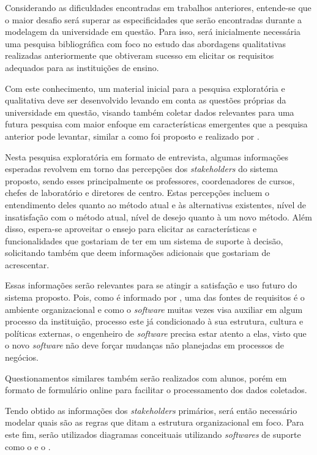 Considerando as dificuldades encontradas em trabalhos anteriores, entende-se que o maior desafio será superar as especificidades que serão encontradas durante a modelagem da universidade em questão. Para isso, será inicialmente necessária uma pesquisa bibliográfica com foco no estudo das abordagens qualitativas realizadas anteriormente que obtiveram sucesso em elicitar os requisitos adequados para as instituições de ensino.


Com este conhecimento, um material inicial para a pesquisa exploratória e qualitativa deve ser desenvolvido levando em conta as questões próprias da universidade em questão, visando também coletar dados relevantes para uma futura pesquisa com maior enfoque em características emergentes que a pesquisa anterior pode levantar, similar a como foi proposto e realizado por .

Nesta pesquisa exploratória em formato de entrevista, algumas informações esperadas revolvem em torno das percepções dos \textit{stakeholders} do sistema proposto, sendo esses principalmente os professores, coordenadores de cursos, chefes de laboratório e diretores de centro. Estas percepções incluem o entendimento deles quanto ao método atual e às alternativas existentes, nível de insatisfação com o método atual, nível de desejo quanto à um novo método. Além disso, espera-se aproveitar o ensejo para elicitar as características e funcionalidades que gostariam de ter em um sistema de suporte à decisão, solicitando também que deem informações adicionais que gostariam de acrescentar.

Essas informações serão relevantes para se atingir a satisfação e uso futuro do sistema proposto. Pois, como é informado por , uma das fontes de requisitos é o ambiente organizacional e como o \textit{software} muitas vezes visa auxiliar em algum processo da instituição, processo este já condicionado à sua estrutura, cultura e políticas externas, o engenheiro de \textit{software} precisa estar atento a elas, visto que o novo \textit{software} não deve forçar mudanças não planejadas em processos de negócios.

Questionamentos similares também serão realizados com alunos, porém em formato de formulário online para facilitar o processamento dos dados coletados.

Tendo obtido as informações dos \textit{stakeholders} primários, será então necessário modelar quais são as regras que ditam a estrutura organizacional em foco. Para este fim, serão utilizados diagramas conceituais utilizando \textit{softwares} de suporte como o  e o .

